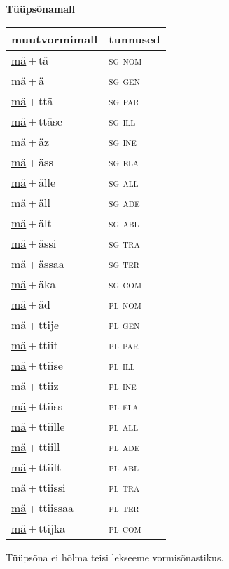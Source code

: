 
\vspace{1.8em}
\begin{minipage}{\textwidth}
\textbf{Tüüpsõnamall \,}\\

\begin{sideways}
\begin{tabular}{l l}
muutvormimall & tunnused \\
\hline
\underline{mä}\,+\,tä & \textsc{ sg nom } \\
\underline{mä}\,+\,ä & \textsc{ sg gen } \\
\underline{mä}\,+\,ttä & \textsc{ sg par } \\
\underline{mä}\,+\,ttäse & \textsc{ sg ill } \\
\underline{mä}\,+\,äz & \textsc{ sg ine } \\
\underline{mä}\,+\,äss & \textsc{ sg ela } \\
\underline{mä}\,+\,älle & \textsc{ sg all } \\
\underline{mä}\,+\,äll & \textsc{ sg ade } \\
\underline{mä}\,+\,ält & \textsc{ sg abl } \\
\underline{mä}\,+\,ässi & \textsc{ sg tra } \\
\underline{mä}\,+\,ässaa & \textsc{ sg ter } \\
\underline{mä}\,+\,äka & \textsc{ sg com } \\
\underline{mä}\,+\,äd & \textsc{ pl nom } \\
\underline{mä}\,+\,ttije & \textsc{ pl gen } \\
\underline{mä}\,+\,ttiit & \textsc{ pl par } \\
\underline{mä}\,+\,ttiise & \textsc{ pl ill } \\
\underline{mä}\,+\,ttiiz & \textsc{ pl ine } \\
\underline{mä}\,+\,ttiiss & \textsc{ pl ela } \\
\underline{mä}\,+\,ttiille & \textsc{ pl all } \\
\underline{mä}\,+\,ttiill & \textsc{ pl ade } \\
\underline{mä}\,+\,ttiilt & \textsc{ pl abl } \\
\underline{mä}\,+\,ttiissi & \textsc{ pl tra } \\
\underline{mä}\,+\,ttiissaa & \textsc{ pl ter } \\
\underline{mä}\,+\,ttijka & \textsc{ pl com } \\
\end{tabular}
\end{sideways}
\label{tab:tüüpsõnamall-mätä}

\end{minipage}

 
\vspace{1em}
\noindent Tüüpsõna ei hõlma teisi lekseeme vormi\-sõnastikus.

